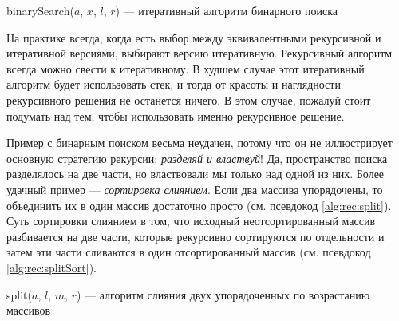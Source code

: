\begin{algorithm}
    \caption{binarySearch($a$, $x$, $l$, $r$) --- итеративный алгоритм бинарного поиска}
    \label{alg:rec:binSearchIter}
    \begin{algorithmic}[1]
            \ELSE
                \ELSE
                \ENDIF
            \ENDIF
        \ENDWHILE
    \end{algorithmic}
\end{algorithm}

На практике всегда, когда есть выбор между эквивалентными рекурсивной и итеративной версиями, выбирают версию итеративную. Рекурсивный алгоритм всегда можно свести к итеративному. В худшем случае этот итеративный алгоритм будет использовать стек, и тогда от красоты и наглядности рекурсивного решения не останется ничего. В этом случае, пожалуй стоит подумать над тем, чтобы использовать именно рекурсивное решение.

Пример с бинарным поиском весьма неудачен, потому что он не иллюстрирует основную стратегию рекурсии: \emph{разделяй и властвуй}! Да, пространство поиска разделялось на две части, но властвовали мы только над одной из них. Более удачный пример --- \emph{сортировка слиянием}. Если два массива упорядочены, то объединить их в один массив достаточно просто (см. псевдокод \ref{alg:rec:split}). Суть сортировки слиянием в том, что исходный неотсортированный массив разбивается на две части, которые рекурсивно сортируются по отдельности и затем эти части сливаются в один отсортированный массив (см. псевдокод \ref{alg:rec:splitSort}).

\begin{algorithm}
    \caption{split($a$, $l$, $m$, $r$) --- алгоритм слияния двух упорядоченных по возрастанию массивов}
    \label{alg:rec:split}
    \begin{algorithmic}[1]
    
    
            \ELSE
                \ENDFOR
            \ENDIF
        \ENDWHILE
    \end{algorithmic}
\end{algorithm}

